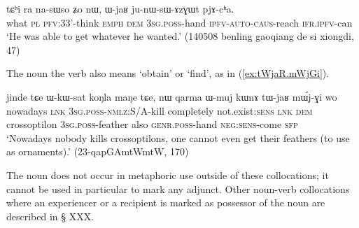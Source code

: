 \begin{exe}
\ex \label{ex:WjaR.junWsAzGWt}
\gll tɕʰi ra na-sɯso ʑo nɯ, ɯ-jaʁ ju-nɯ-sɯ-ɤzɣɯt pjɤ-cʰa.  \\
what \textsc{pl} \textsc{pfv}:3\fl{}3'-think \textsc{emph} \textsc{dem} \textsc{3sg}.\textsc{poss}-hand \textsc{ipfv}-\textsc{auto}-\textsc{caus}-reach \textsc{ifr}.\textsc{ipfv}-can \\
\glt  `He was able to get whatever he wanted.' (140508 benling gaoqiang de si xiongdi, 47)
\end{exe}

The noun  the verb  also means `obtain' or `find', as in (\ref{ex:tWjaR.mWjGi}).

\begin{exe}
\ex \label{ex:tWjaR.mWjGi}
\gll jinde tɕe ɯ-kɯ-sat koŋla maŋe tɕe, nɯ qarma ɯ-muj kɯnɤ tɯ-jaʁ mɯ́j-ɣi wo \\
nowadays \textsc{lnk} \textsc{3sg}.\textsc{poss}-\textsc{nmlz}:S/A-kill completely not.exist:\textsc{sens} \textsc{lnk} \textsc{dem} crossoptilon \textsc{3sg}.\textsc{poss}-feather also \textsc{genr}.\textsc{poss}-hand \textsc{neg}:\textsc{sens}-come \textsc{sfp} \\
\glt `Nowadays nobody kills crossoptilons, one cannot even get their feathers (to use as ornaments).' (23-qapGAmtWmtW, 170)
\end{exe}

The noun  does not occur in metaphoric use outside of these collocations; it cannot be used in particular to mark any adjunct. Other noun-verb collocations where an experiencer or a recipient is marked as possessor of the noun are described in § XXX.
